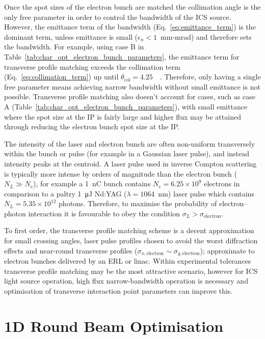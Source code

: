 \documentclass[../main.tex]{subfiles}
\begin{document}
Once the spot sizes of the electron bunch are matched the collimation angle is the only free parameter in order to control the bandwidth of the ICS source. However, the emittance term of the bandwidth (Eq.~\ref{eq:emittance_term}) is the dominant term, unless emittance is small ($\epsilon_{n} < 1$~\si{\milli\meter}-\si{\milli\radian}) and therefore sets the bandwidth. For example, using case B in Table~\ref{tab:char_opt_electron_bunch_parameters}, the emittance term for transverse profile matching exceeds the collimation term (Eq.~\ref{eq:collimation_term}) up until $\theta_{\mathrm{col}} = 4.25$~\si{\milli\rad}. Therefore, only having a single free parameter means achieving narrow bandwidth without small emittance is not possible. Transverse profile matching also doesn't account for cases, such as case A (Table~\ref{tab:char_opt_electron_bunch_parameters}), with small emittance where the spot size at the IP is fairly large and higher flux may be attained through reducing the electron bunch spot size at the IP. 

The intensity of the laser and electron bunch are often non-uniform transversely within the bunch or pulse (for example in a Gaussian laser pulse), and instead intensity peaks at the centroid. A laser pulse used in inverse Compton scattering is typically more intense by orders of magnitude than the electron bunch ($N_{L} \gg N_{e}$), for example a 1~\si{\nano\coulomb} bunch contains $N_{e} = 6.25\times 10^{9}$ electrons in comparison to a paltry 1~\si{\micro\joule} Nd:YAG ($\lambda = 1064$~\si{\nano\meter}) laser pulse which contains $N_{L} = 5.35\times 10^{12}$ photons. Therefore, to maximise the probability of electron--photon interaction it is favourable to obey the condition $\sigma_{L} > \sigma_{\mathrm{electron}}$.

To first order, the transverse profile matching scheme is a decent approximation for small crossing angles, laser pulse profiles chosen to avoid the worst diffraction effects and near-round transverse profiles ($\sigma_{x,\mathrm{electron}}\sim\sigma_{y,\mathrm{electron}}$); approximate to electron bunches delivered by an ERL or linac. Within experimental tolerances transverse profile matching may be the most attractive scenario, however for ICS light source operation, high flux narrow-bandwidth operation is necessary and optimisation of transverse interaction point parameters can improve this. 

\section{1D Round Beam Optimisation}
\label{sec:RB_optimisation}
\end{document}
